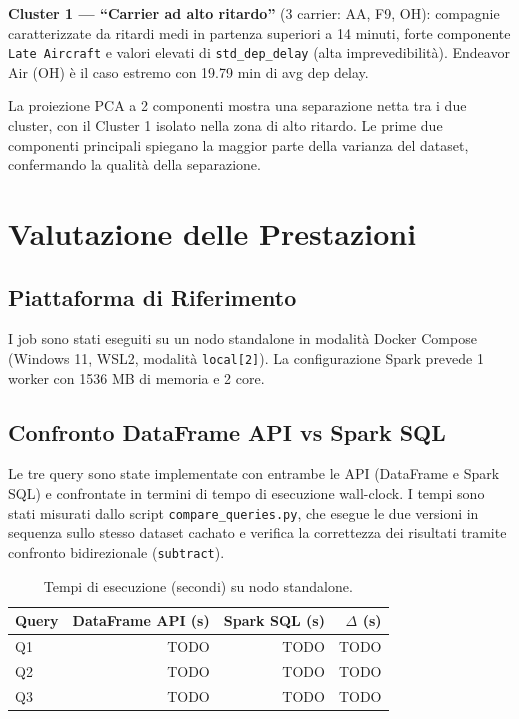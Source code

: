 \documentclass[sigconf]{acmart}
\begin{document}
\textbf{Cluster 1 — ``Carrier ad alto ritardo''} (3 carrier: AA, F9, OH):
compagnie caratterizzate da ritardi medi in partenza superiori a 14 minuti,
forte componente \texttt{Late Aircraft} e valori elevati di
\texttt{std\_dep\_delay} (alta imprevedibilità). Endeavor Air (OH) è il caso
estremo con 19.79 min di avg dep delay.

La proiezione PCA a 2 componenti mostra una separazione netta tra i due
cluster, con il Cluster 1 isolato nella zona di alto ritardo. Le prime due
componenti principali spiegano la maggior parte della varianza del dataset,
confermando la qualità della separazione.

\section{Valutazione delle Prestazioni}

\subsection{Piattaforma di Riferimento}

I job sono stati eseguiti su un nodo standalone in modalità Docker Compose
(Windows 11, WSL2, modalità \texttt{local[2]}). La configurazione Spark
prevede 1 worker con 1536 MB di memoria e 2 core.

\subsection{Confronto DataFrame API vs Spark SQL}

Le tre query sono state implementate con entrambe le API (DataFrame e Spark
SQL) e confrontate in termini di tempo di esecuzione wall-clock. I tempi sono
stati misurati dallo script \texttt{compare\_queries.py}, che esegue le due
versioni in sequenza sullo stesso dataset cachato e verifica la correttezza
dei risultati tramite confronto bidirezionale (\texttt{subtract}).

\begin{table}[h]
\caption{Tempi di esecuzione (secondi) su nodo standalone.}
\label{tab:timing}
\begin{tabular}{lrrr}
\toprule
Query & DataFrame API (s) & Spark SQL (s) & $\Delta$ (s) \\
\midrule
Q1 & TODO & TODO & TODO \\
Q2 & TODO & TODO & TODO \\
Q3 & TODO & TODO & TODO \\
\bottomrule
\end{tabular}
\end{table}
\end{document}

